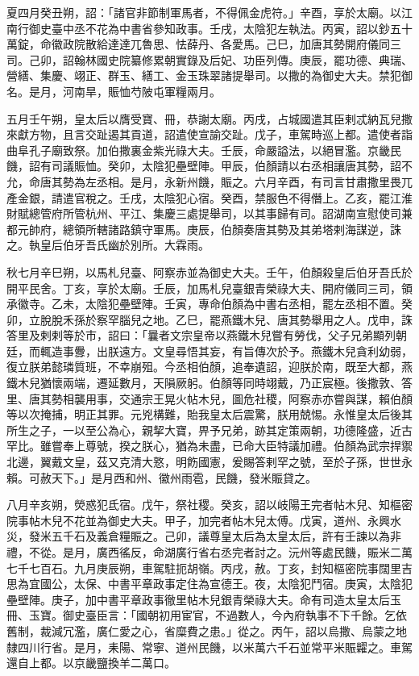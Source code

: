 \begin{pinyinscope}
 夏四月癸丑朔，詔：「諸官非節制軍馬者，不得佩金虎符。」辛酉，享於太廟。以江南行御史臺中丞不花為中書省參知政事。壬戌，太陰犯左執法。丙寅，詔以鈔五十萬錠，命徽政院散給達達兀魯思、怯薛丹、各愛馬。己巳，加唐其勢開府儀同三司。己卯，詔翰林國史院纂修累朝實錄及后妃、功臣列傳。庚辰，罷功德、典瑞、營繕、集慶、翊正、群玉、繕工、金玉珠翠諸提舉司。以撒的為御史大夫。禁犯御名。是月，河南旱，賑恤芍陂屯軍糧兩月。



 五月壬午朔，皇太后以膺受寶、冊，恭謝太廟。丙戌，占城國遣其臣剌忒納瓦兒撒來獻方物，且言交趾遏其貢道，詔遣使宣諭交趾。戊子，車駕時巡上都。遣使者詣曲阜孔子廟致祭。加伯撒裏金紫光祿大夫。壬辰，命嚴謚法，以絕冒濫。京畿民饑，詔有司議賑恤。癸卯，太陰犯壘壁陣。甲辰，伯顏請以右丞相讓唐其勢，詔不允，命唐其勢為左丞相。是月，永新州饑，賑之。六月辛酉，有司言甘肅撒里畏兀產金銀，請遣官稅之。壬戌，太陰犯心宿。癸酉，禁服色不得僭上。乙亥，罷江淮財賦總管府所管杭州、平江、集慶三處提舉司，以其事歸有司。詔湖南宣慰使司兼都元帥府，總領所轄諸路鎮守軍馬。庚辰，伯顏奏唐其勢及其弟塔剌海謀逆，誅之。執皇后伯牙吾氏幽於別所。大霖雨。



 秋七月辛巳朔，以馬札兒臺、阿察赤並為御史大夫。壬午，伯顏殺皇后伯牙吾氏於開平民舍。丁亥，享於太廟。壬辰，加馬札兒臺銀青榮祿大夫、開府儀同三司，領承徽寺。乙未，太陰犯壘壁陣。壬寅，專命伯顏為中書右丞相，罷左丞相不置。癸卯，立脫脫禾孫於察罕腦兒之地。乙巳，罷燕鐵木兒、唐其勢舉用之人。戊申，誅答里及剌剌等於市，詔曰：「曩者文宗皇帝以燕鐵木兒嘗有勞伐，父子兄弟顯列朝廷，而輒造事釁，出朕遠方。文皇尋悟其妄，有旨傳次於予。燕鐵木兒貪利幼弱，復立朕弟懿璘質班，不幸崩殂。今丞相伯顏，追奉遺詔，迎朕於南，既至大都，燕鐵木兒猶懷兩端，遷延數月，天隕厥躬。伯顏等同時翊戴，乃正宸極。後撒敦、答里、唐其勢相襲用事，交通宗王晃火帖木兒，圖危社稷，阿察赤亦嘗與謀，賴伯顏等以次掩捕，明正其罪。元兇構難，貽我皇太后震驚，朕用兢惕。永惟皇太后後其所生之子，一以至公為心，親挈大寶，畀予兄弟，跡其定策兩朝，功德隆盛，近古罕比。雖嘗奉上尊號，揆之朕心，猶為未盡，已命大臣特議加禮。伯顏為武宗捍禦北邊，翼戴文皇，茲又克清大憝，明飭國憲，爰賜答剌罕之號，至於子孫，世世永賴。可赦天下。」是月西和州、徽州雨雹，民饑，發米賑貸之。



 八月辛亥朔，熒惑犯氐宿。戊午，祭社稷。癸亥，詔以岐陽王完者帖木兒、知樞密院事帖木兒不花並為御史大夫。甲子，加完者帖木兒太傅。戊寅，道州、永興水災，發米五千石及義倉糧賑之。己卯，議尊皇太后為太皇太后，許有壬諫以為非禮，不從。是月，廣西徭反，命湖廣行省右丞完者討之。沅州等處民饑，賑米二萬七千七百石。九月庚辰朔，車駕駐扼胡嶺。丙戌，赦。丁亥，封知樞密院事闊里吉思為宜國公，太保、中書平章政事定住為宣德王。夜，太陰犯鬥宿。庚寅，太陰犯壘壁陣。庚子，加中書平章政事徹里帖木兒銀青榮祿大夫。命有司造太皇太后玉冊、玉寶。御史臺臣言：「國朝初用宦官，不過數人，今內府執事不下千餘。乞依舊制，裁減冗濫，廣仁愛之心，省糜費之患。」從之。丙午，詔以烏撒、烏蒙之地隸四川行省。是月，耒陽、常寧、道州民饑，以米萬六千石並常平米賑糶之。車駕還自上都。以京畿鹽換羊二萬口。




\end{pinyinscope}
